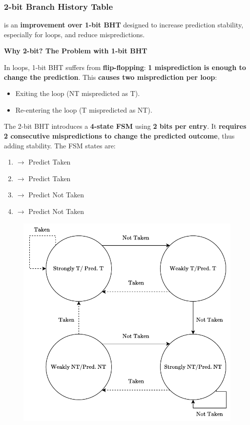 \subsubsection{2-bit Branch History Table}

 is an \textbf{improvement over 1-bit BHT} designed to increase prediction stability, especially for loops, and reduce mispredictions.

\highspace
\begin{flushleft}
    \textcolor{Green3}{ \textbf{Why 2-bit? The Problem with 1-bit BHT}}
\end{flushleft}
In loops, 1-bit BHT suffers from \textbf{flip-flopping}: \textbf{1 misprediction is enough to change the prediction}. This \textcolor{Red2}{\textbf{causes two misprediction per loop}}:
\begin{itemize}
    \item Exiting the loop (NT mispredicted as T).
    \item Re-entering the loop (T mispredicted as NT).
\end{itemize}
The 2-bit BHT introduces a \textbf{4-state FSM} using \textbf{2 bits per entry}. It \textbf{requires 2 consecutive mispredictions to change the predicted outcome}, thus adding stability. The FSM states are:
\begin{enumerate}
    \item {} $\rightarrow$ Predict Taken
    \item {} $\rightarrow$ Predict Taken
    \item {} $\rightarrow$ Predict Not Taken
    \item {} $\rightarrow$ Predict Not Taken
\end{enumerate}

\begin{figure}[!htp]
    \centering
    \includegraphics[width=.85\textwidth]{img/fsm-2-bit-bht.pdf}
\end{figure}

